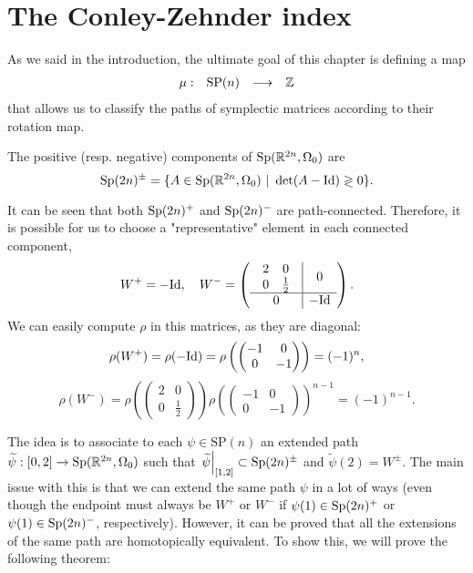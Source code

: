 \section{The Conley-Zehnder index}

As we said in the introduction, the ultimate goal of this chapter is defining a map
\[\begin{array}{rccc} \mu : & \text{SP}(n) & \longrightarrow & \mathbb{Z} \end{array}\]
that allows us to classify the paths of symplectic matrices according to their rotation map.

\begin{deff} The positive (resp. negative) components of $\mathrm{Sp}(\mathbb{R}^{2n},\Omega_0)$ are
\[\mathrm{Sp}(2n)^{\pm} = \{A \in \mathrm{Sp}(\mathbb{R}^{2n},\Omega_0) \ | \ \det(A - \text{Id}) \gtrless 0 \} .\]
\end{deff}

It can be seen that both $\mathrm{Sp}(2n)^+$ and $\mathrm{Sp}(2n)^-$ are path-connected. Therefore, it is possible for us to choose a "representative" element in each connected component,
\[W^+ = - \mathrm{Id}, \ \ \ W^- = \left( \begin{array}{c|c} \begin{array}{cc} 2 & 0 \\ 0 & \frac12 \end{array} & 0 \\ \hline 0 & - \mathrm{Id} \end{array} \right) .\]
We can easily compute $\rho$ in this matrices, as they are diagonal:
\[\rho(W^+) = \rho(- \mathrm{Id}) = \rho\left( \begin{pmatrix} -1 & 0 \\ 0 & -1 \end{pmatrix} \right) = (-1)^n ,\]
\[\rho(W^-) = \rho\left( \begin{pmatrix} 2 & 0 \\ 0 & \frac12 \end{pmatrix} \right) \rho\left(\begin{pmatrix}-1&0\\0&-1\end{pmatrix}\right)^{n-1} = (-1)^{n-1} .\]

The idea is to associate to each $\psi \in \text{SP}(n)$ an extended path $\widetilde{\psi} : [0,2] \rightarrow \mathrm{Sp}(\mathbb{R}^{2n},\Omega_0)$ such that $\left. \widetilde{\psi} \right|_{[1,2]} \subset \mathrm{Sp}(2n)^{\pm}$ and $\widetilde{\psi}(2) = W^{\pm}$. The main issue with this is that we can extend the same path $\psi$ in a lot of ways (even though the endpoint must always be $W^+$ or $W^-$ if $\psi(1) \in \mathrm{Sp}(2n)^+$ or $\psi(1) \in \mathrm{Sp}(2n)^-$, respectively). However, it can be proved that all the extensions of the same path are homotopically equivalent. To show this, we will prove the following theorem:

